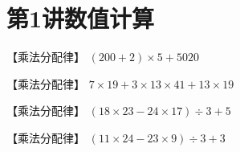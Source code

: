 \section{第1讲\quad 数值计算}

\item {
    【乘法分配律】
    $(200+2)\times 5 + 5020$
    \vspace{1cm}
}



\item {
    【乘法分配律】
    $7\times 19 + 3\times 13\times 41 + 13\times 19$
    \vspace{1cm}
}

\item {
    【乘法分配律】
    $(18\times 23 - 24\times 17)\div 3 + 5$
    \vspace{1cm}
}

\item {
    【乘法分配律】
    $(11\times 24 - 23\times 9)\div 3 + 3$
    \vspace{1cm}
}





